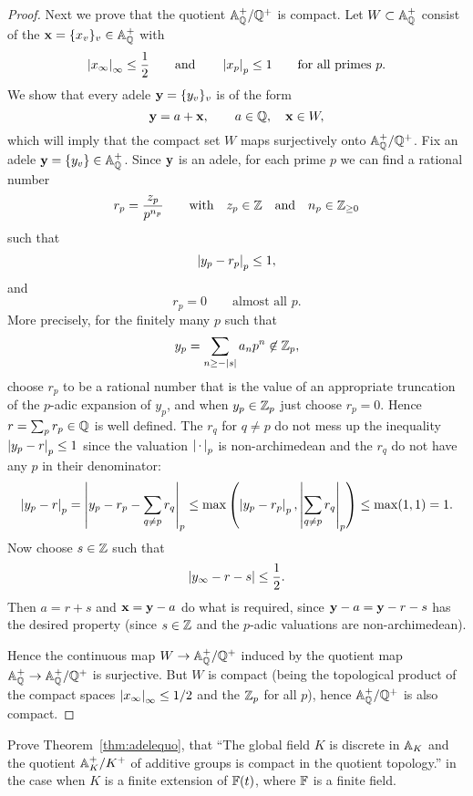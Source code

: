 \begin{proof}
Next we prove that the quotient $\AA_\Q^+/\Q^+$ is compact.
Let $W\subset \AA_\Q^+$ consist of the $\bx=\{x_v\}_v\in \AA_\Q^+$
with
$$
  \abs{x_\infty}_\infty \leq \frac{1}{2}\qquad\text{and}\qquad
   \abs{x_p}_p \leq 1\qquad\text{for all primes $p$}.
$$
We show that every adele $\by=\{y_v\}_v$ is of the form
$$
  \by = a + \bx, \qquad a\in \Q, \quad \bx\in W,
$$
which will imply that the compact set $W$ maps surjectively
onto $\AA_\Q^+ / \Q^+$.
Fix an adele $\by=\{y_v\}\in\AA_\Q^+$.  Since $\by$
is an adele, for each prime $p$ we can find
a rational number
$$
  r_p = \frac{z_p}{p^{n_p}}
\qquad \text{with} \quad z_p \in \Z \quad \text{and} \quad n_p \in \Z_{\geq 0}
$$
such that
$$
  \abs{y_p - r_p}_p \leq 1,
$$
and
$$
  r_p = 0 \qquad \text{almost all $p$}.
$$
More precisely, for the finitely
many $p$ such that $$y_p = \sum_{n\geq -\abs{s}} a_np^n \not\in\Z_p,$$ choose
$r_p$ to be a rational number that is the value of an appropriate truncation
of the $p$-adic expansion of $y_p$, and
when $y_p\in \Z_p$ just choose $r_p = 0$.
Hence $r=\sum_{p} r_p\in\Q$ is well defined.
The $r_q$ for $q\neq p$ do not mess up the inequality
$\abs{y_p - r}_p \leq 1$ since the
valuation $\absspc_p$ is non-archimedean and the $r_q$ do not have any $p$ in
their denominator:
$$\abs{y_p  - r}_p
   = \abs{y_p - r_p - \sum_{q\neq p} r_q}_p
   \leq \max\left(\abs{y_p - r_p}_p, \abs{\sum_{q\neq p} r_q}_p\right)
   \leq \max(1,1) = 1.
$$
Now choose $s\in\Z$ such that
$$
  \abs{y_\infty - r-s} \leq \frac{1}{2}.
$$
Then $a=r+s$ and $\bx = \by - a$ do what is required,
since $\by - a = \by - r - s$ has the desired property
(since $s\in\Z$ and the $p$-adic valuations are
non-archimedean).

Hence the continuous map $W\to \AA_\Q^+/\Q^+$ induced by the quotient
map $\AA_\Q^+ \to \AA_\Q^+/\Q^+$ is surjective.  But $W$ is compact
(being the topological product of the compact spaces
$\abs{x_\infty}_\infty\leq 1/2$ and the $\Z_p$ for all $p$), hence
$\AA_\Q^+/\Q^+$ is also compact.
\end{proof}

\begin{exercise}\label{ex:adeles2}
  Prove Theorem~\ref{thm:adelequo}, that ``The global field $K$
  is discrete in $\AA_K$ and the quotient $\AA_K^+/K^+$ of additive
  groups is compact in the quotient topology.'' in the case when $K$
  is a finite extension of $\F(t)$, where $\F$ is a finite field.
\end{exercise}


